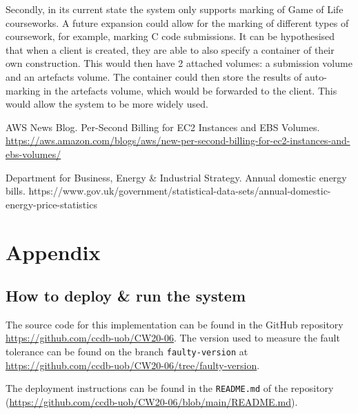 \documentclass[runningheads]{llncs}
\begin{document}
Secondly, in its current state the system only supports marking of Game of Life courseworks. A future expansion could allow for the marking of different types of coursework, for example, marking C code submissions. It can be hypothesised that when a client is created, they are able to also specify a container of their own construction. This would then have 2 attached volumes: a submission volume and an artefacts volume. The container could then store the results of auto-marking in the artefacts volume, which would be forwarded to the client. This would allow the system to be more widely used.  


\begin{thebibliography}{8}

 AWS News Blog. Per-Second Billing for EC2 Instances and EBS Volumes. \url{https://aws.amazon.com/blogs/aws/new-per-second-billing-for-ec2-instances-and-ebs-volumes/}

 Department for Business, Energy \& Industrial Strategy. Annual domestic energy bills. https://www.gov.uk/government/statistical-data-sets/annual-domestic-energy-price-statistics

\end{thebibliography}

\section*{Appendix}
\subsection*{How to deploy \& run the system}

The source code for this implementation can be found in the GitHub repository \url{https://github.com/ccdb-uob/CW20-06}. The version used to measure the fault tolerance can be found on the branch \texttt{faulty-version} at \url{https://github.com/ccdb-uob/CW20-06/tree/faulty-version}.

The deployment instructions can be found in the \texttt{README.md} of the repository (\url{https://github.com/ccdb-uob/CW20-06/blob/main/README.md}). 
\end{document}

